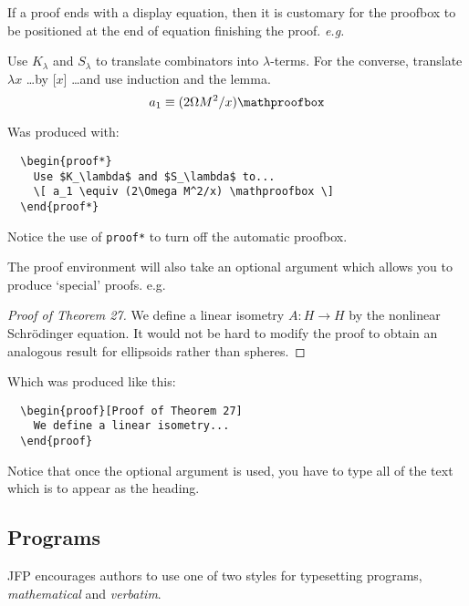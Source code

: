 \documentclass{jfp1}
\newcommand\eg{\emph{e.g.}\ }
\begin{document}
If a proof ends with a display equation, then it is customary for the proofbox
to be positioned at the end of equation finishing the proof. \eg
%
\begin{proof*}
  Use $K_\lambda$ and $S_\lambda$ to translate combinators
  into $\lambda$-terms. For the converse, translate
  $\lambda x$ \ldots by [$x$] \ldots and use induction
  and the lemma.
  \[ a_1 \equiv (2\Omega M^2/x) \mathproofbox \]
\end{proof*}
%
Was produced with:
%
\begin{verbatim}
  \begin{proof*}
    Use $K_\lambda$ and $S_\lambda$ to...
    \[ a_1 \equiv (2\Omega M^2/x) \mathproofbox \]
  \end{proof*}
\end{verbatim}
%
Notice the use of \verb"proof*" to turn off the automatic proofbox.

The proof environment will also take an optional argument which allows you
to produce `special' proofs. e.g.
%
\begin{proof}[Proof of Theorem 27]
  We define a linear isometry $A:H\rightarrow H$ by the nonlinear
  Schr\"{o}dinger equation. It would not be hard to modify the
  proof to obtain an analogous result for ellipsoids rather than
  spheres.
\end{proof}
%
Which was produced like this:
%
\begin{verbatim}
  \begin{proof}[Proof of Theorem 27]
    We define a linear isometry...
  \end{proof}
\end{verbatim}
%
Notice that once the optional argument is used, you have to type all of
the text which is to appear as the heading.

\subsection{Programs}\label{sec-programs}

JFP encourages authors to use one of two styles for typesetting programs,
\emph{mathematical} and \emph{verbatim}.
\end{document}
